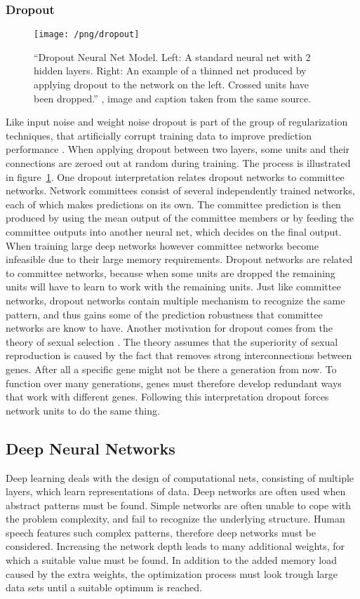\subsubsection{Dropout}
\begin{figure}
\texttt{[image: /png/dropout]}
\caption{\enquote{Dropout Neural Net Model. Left: A standard neural net with 2 hidden layers. Right: An example of a thinned net produced by applying dropout to the network on the left. Crossed units have been dropped.} \cite{Srivastava2014}, image and caption taken from the same source.}
\label{fig:Dropout}
\end{figure}
Like input noise and weight noise dropout is part of the group of regularization techniques, that artificially corrupt training data to improve prediction performance \cite{Wager2013}. When applying dropout between two layers, some units and their connections are zeroed out at random during training. The process is illustrated in figure~\ref{fig:Dropout}.
One dropout interpretation relates dropout networks to committee networks. Network committees consist of several independently trained networks, each of which makes predictions on its own. The committee prediction is then produced by using the mean output of the committee members or by feeding the committee outputs into another neural net, which decides on the final output.
When training large deep networks however committee networks become infeasible due to their large memory requirements. Dropout networks are related to committee networks, because when some units are dropped the remaining units will have to learn to work with the remaining units. Just like committee networks, dropout networks contain multiple mechanism to recognize the same pattern, and thus gains some of the prediction robustness that committee networks are know to have.
Another motivation for dropout comes from the theory of sexual selection \cite{Srivastava2014}. The theory assumes that the superiority of sexual reproduction is caused by the fact that removes strong interconnections between genes. After all a specific gene might not be there a generation from now. To function over many generations, genes must therefore develop redundant ways that work with different genes.
Following this interpretation dropout forces network units to do the same thing.

\subsection{Deep Neural Networks}
Deep learning deals with the design of computational nets, consisting of multiple layers, which learn representations of data. Deep networks are often used when abstract
patterns must be found. Simple networks are often unable to cope with the problem complexity, and fail to recognize the underlying structure. Human speech features such complex patterns, therefore deep networks must be considered. Increasing the network depth leads to many additional weights, for which a suitable value must be found.
In addition to the added memory load caused by the extra weights, the optimization process must look trough large data sets until a suitable optimum is reached.
